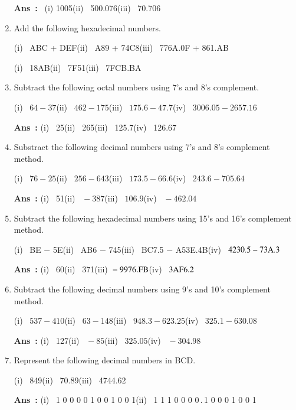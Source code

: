 \begin{enumerate}
\smallskip
{\bf Ans~:}~ (i) 1005\qquad (ii)~ 500.076\qquad (iii)~ 70.706

\item Add the following hexadecimal numbers.

\smallskip
(i)~ ABC + DEF\qquad (ii)~ A89 + 74C8\qquad (iii)~ 776A.0F + 861.AB

\smallskip
(i)~ 18AB\qquad (ii)~ 7F51\qquad (iii)~ 7FCB.BA

\item Subtract the following octal numbers using 7's and 8's complement.

\smallskip
(i)~ $64-37$\qquad (ii)~ $462-175$\qquad (iii)~ $175.6-47.7$\qquad (iv)~ $3006.05-2657.16$

\smallskip
{\bf Ans~:} (i)~ 25\qquad (ii)~ 265\qquad (iii)~ 125.7\qquad (iv)~ 126.67

\item Substract the following decimal numbers using 7's and 8's complement method.

\smallskip
(i)~ $76-25$\qquad (ii)~ $256-643$\qquad (iii)~ $173.5-66.6$\qquad (iv)~ $243.6-705.64$

\smallskip
{\bf Ans~:} (i)~ 51\qquad (ii)~ ${}-387$\qquad (iii)~ $106.9$\qquad (iv)~ ${}-462.04$

\item Subtract the following hexadecimal numbers using 15's and 16's complement method.

\smallskip
(i)~ BE $-$ 5E\qquad (ii)~ AB6 $-$ 745\qquad (iii)~ BC7.5 $-$ A53E.4B\qquad (iv)~ $4230.5-73\textrm{A}.3$

\smallskip
{\bf Ans~:} (i)~ 60\qquad (ii)~ 371\qquad (iii) ${}-9976.\textrm{F}\textrm{B}$\qquad (iv)~ $3\textrm{A}\textrm{F} 6.2$

\item Subtract the following decimal numbers using 9's and 10's complement method.

\smallskip
(i)~ $537-410$\qquad (ii)~ $63-148$\qquad (iii)~ $948.3-623.25$\qquad (iv)~ $325.1-630.08$

\smallskip
{\bf Ans~:} (i)~ 127\qquad (ii)~ ${}-85$\qquad (iii)~ $325.05$\qquad (iv)~ ${}-304.98$

\item Represent the following decimal numbers in BCD.

\smallskip
(i)~ 849\qquad (ii)~ 70.89\qquad (iii)~ 4744.62

\smallskip
{\bf Ans~:} (i)~ 1 0 0 0 0 1 0 0 1 0 0 1\qquad (ii)~ 1 1 1 0 0 0 0\,.\,1 0 0 0 1 0 0 1


\end{enumerate}
